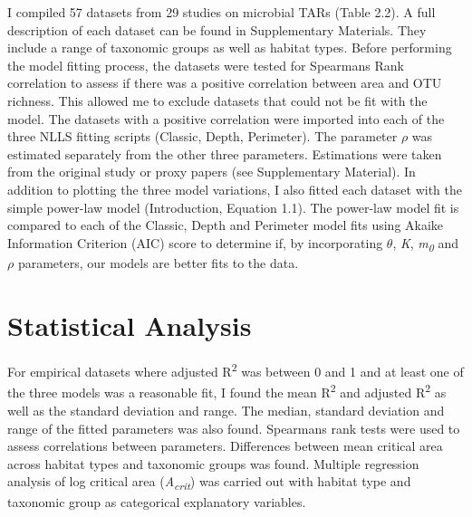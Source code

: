 \noindent I compiled 57 datasets from 29 studies on microbial TARs (Table 2.2). A full description of each dataset can be found in Supplementary Materials. They include a range of taxonomic groups as well as habitat types. Before performing the model fitting process, the datasets were tested for Spearmans Rank correlation to assess if there was a positive correlation between area and OTU richness. This allowed me to exclude datasets that could not be fit with the model. The datasets with a positive correlation were imported into each of the three NLLS fitting scripts (Classic, Depth, Perimeter). \noindent \noindent The parameter $\rho$ was estimated separately from the other three parameters. Estimations were taken from the original study or proxy papers (see Supplementary Material). In addition to plotting the three model variations, I also fitted each dataset with the simple power-law model (Introduction, Equation 1.1). The power-law model fit is compared to each of the Classic, Depth and Perimeter model fits using Akaike Information Criterion (AIC) score to determine if, by incorporating $\theta$, \textit{K}, \textit{m\textsubscript{0}} and $\rho$ parameters, our models are better fits to the data. \\ 

\section{Statistical Analysis}

{\texorpdfstring
Foor empirical datasets where adjusted R\textsuperscript{2} was between 0 and 1 and at least one of the three models was a reasonable fit, I found the mean R\textsuperscript{2} and adjusted R\textsuperscript{2} as well as the standard deviation and range. The median, standard deviation and range of the fitted parameters was also found. Spearmans rank tests were used to assess correlations between parameters. Differences between mean critical area across habitat types and taxonomic groups was found. Multiple regression analysis of log critical area (\textit{A\textsubscript{crit}}) was carried out with habitat type and taxonomic group as categorical explanatory variables. }



